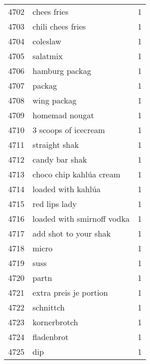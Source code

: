 \begin{tabular}{llr}
4702 &                                        chees fries &      1 \\
4703 &                                  chili chees fries &      1 \\
4704 &                                           coleslaw &      1 \\
4705 &                                           salatmix &      1 \\
4706 &                                     hamburg packag &      1 \\
4707 &                                             packag &      1 \\
4708 &                                        wing packag &      1 \\
4709 &                                     homemad nougat &      1 \\
4710 &                               3 scoops of icecream &      1 \\
4711 &                                      straight shak &      1 \\
4712 &                                     candy bar shak &      1 \\
4713 &                            choco chip kahlúa cream &      1 \\
4714 &                                 loaded with kahlúa &      1 \\
4715 &                                      red lips lady &      1 \\
4716 &                         loaded with smirnoff vodka &      1 \\
4717 &                              add shot to your shak &      1 \\
4718 &                                              micro &      1 \\
4719 &                                               suss &      1 \\
4720 &                                              partn &      1 \\
4721 &                             extra preis je portion &      1 \\
4722 &                                          schnittch &      1 \\
4723 &                                       kornerbrotch &      1 \\
4724 &                                         fladenbrot &      1 \\
4725 &                                                dip &      1 \\

\end{tabular}
